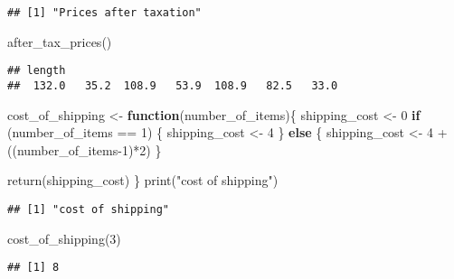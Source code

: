 \documentclass[
]{article}
\newenvironment{Shaded}{\begin{snugshade}}{\end{snugshade}}
\newcommand{\ControlFlowTok}[1]{\textcolor[rgb]{0.13,0.29,0.53}{\textbf{#1}}}
\newcommand{\DecValTok}[1]{\textcolor[rgb]{0.00,0.00,0.81}{#1}}
\newcommand{\FunctionTok}[1]{\textcolor[rgb]{0.00,0.00,0.00}{#1}}
\newcommand{\NormalTok}[1]{#1}
\newcommand{\OtherTok}[1]{\textcolor[rgb]{0.56,0.35,0.01}{#1}}
\newcommand{\SpecialCharTok}[1]{\textcolor[rgb]{0.00,0.00,0.00}{#1}}
\newcommand{\StringTok}[1]{\textcolor[rgb]{0.31,0.60,0.02}{#1}}
\begin{document}
\begin{verbatim}
## [1] "Prices after taxation"
\end{verbatim}

\begin{Shaded}
\begin{Highlighting}[]
\FunctionTok{after\_tax\_prices}\NormalTok{()}
\end{Highlighting}
\end{Shaded}

\begin{verbatim}
## length                                           
##  132.0   35.2  108.9   53.9  108.9   82.5   33.0
\end{verbatim}

\begin{Shaded}
\begin{Highlighting}[]
\NormalTok{cost\_of\_shipping }\OtherTok{\textless{}{-}} \ControlFlowTok{function}\NormalTok{(number\_of\_items)\{}
\NormalTok{  shipping\_cost }\OtherTok{\textless{}{-}} \DecValTok{0}
  \ControlFlowTok{if}\NormalTok{ (number\_of\_items }\SpecialCharTok{==} \DecValTok{1}\NormalTok{) \{}
\NormalTok{    shipping\_cost }\OtherTok{\textless{}{-}} \DecValTok{4}
\NormalTok{  \} }\ControlFlowTok{else}\NormalTok{ \{}
\NormalTok{    shipping\_cost }\OtherTok{\textless{}{-}} \DecValTok{4} \SpecialCharTok{+}\NormalTok{ ((number\_of\_items}\DecValTok{{-}1}\NormalTok{)}\SpecialCharTok{*}\DecValTok{2}\NormalTok{)}
\NormalTok{  \}}
  
  \FunctionTok{return}\NormalTok{(shipping\_cost)}
\NormalTok{\}}
\FunctionTok{print}\NormalTok{(}\StringTok{"cost of shipping"}\NormalTok{)}
\end{Highlighting}
\end{Shaded}

\begin{verbatim}
## [1] "cost of shipping"
\end{verbatim}

\begin{Shaded}
\begin{Highlighting}[]
\FunctionTok{cost\_of\_shipping}\NormalTok{(}\DecValTok{3}\NormalTok{)}
\end{Highlighting}
\end{Shaded}

\begin{verbatim}
## [1] 8
\end{verbatim}
\end{document}
